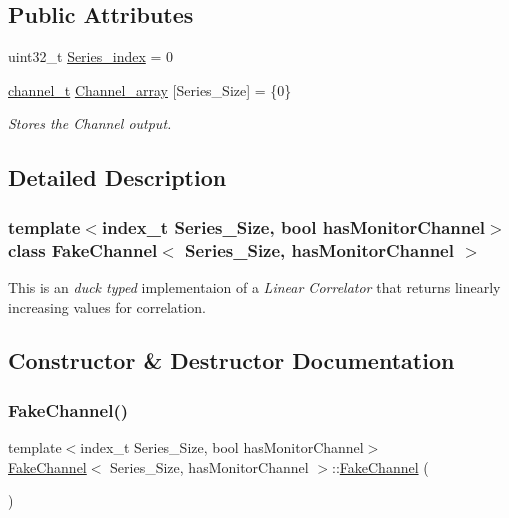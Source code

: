\subsection*{Public Attributes}
\begin{DoxyCompactItemize}
\item 
uint32\+\_\+t \hyperlink{classFakeChannel_a471a99ca4707397f949e6c26a3012ffe}{Series\+\_\+index} = 0
\item 
\hyperlink{types_8hpp_a9f8f935e7952f42d763385090e3404a5}{channel\+\_\+t} \hyperlink{classFakeChannel_a51f14eee081adbcd3db827b669e45749}{Channel\+\_\+array} \mbox{[}Series\+\_\+\+Size\mbox{]} = \{0\}
\begin{DoxyCompactList}\small\item\em Stores the Channel output. \end{DoxyCompactList}\end{DoxyCompactItemize}


\subsection{Detailed Description}
\subsubsection*{template$<$index\+\_\+t Series\+\_\+\+Size, bool has\+Monitor\+Channel$>$\newline
class Fake\+Channel$<$ Series\+\_\+\+Size, has\+Monitor\+Channel $>$}

This is an {\itshape duck typed} implementaion of a {\itshape Linear Correlator} that returns linearly increasing values for correlation. 

\subsection{Constructor \& Destructor Documentation}
\mbox{\label{classFakeChannel_a7b6ecb79fe6460f07d395c4df4b30cda}} 
\subsubsection{\texorpdfstring{Fake\+Channel()}{FakeChannel()}}
{\footnotesize\ttfamily template$<$index\+\_\+t Series\+\_\+\+Size, bool has\+Monitor\+Channel$>$ \\
\hyperlink{classFakeChannel}{Fake\+Channel}$<$ Series\+\_\+\+Size, has\+Monitor\+Channel $>$\+::\hyperlink{classFakeChannel}{Fake\+Channel} (\begin{DoxyParamCaption}{ }\end{DoxyParamCaption})\hspace{0.3cm}{\ttfamily [inline]}}



